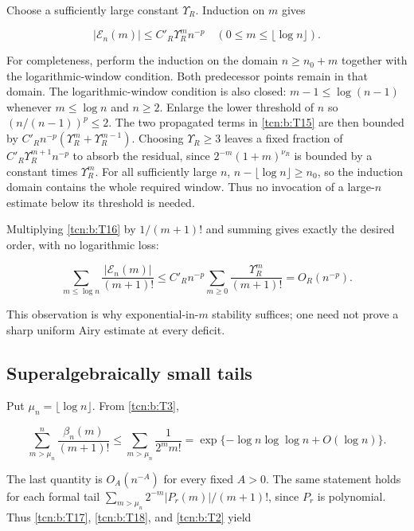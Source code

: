 \documentclass[11pt,letterpaper]{article}
\theoremstyle{remark}
\begin{document}
Choose a sufficiently large constant \(\Upsilon_R\). Induction on \(m\) gives

\[
 |\mathcal E_n(m)|\le C'_R\Upsilon_R^m n^{-p}
       \quad(0\le m\le\lfloor\log n\rfloor).                 \tag{T16}\label{tcn:b:T16}
\]

For completeness, perform the induction on the domain \(n\ge n_0+m\)
together with the logarithmic-window condition. Both predecessor points
remain in that domain. The logarithmic-window condition is also closed:
\(m-1\le\log(n-1)\) whenever \(m\le\log n\) and \(n\ge2\). Enlarge the
lower threshold of \(n\) so \((n/(n-1))^p\le2\). The two propagated
terms in \eqref{tcn:b:T15} are then bounded by \(C'_Rn^{-p}(\Upsilon_R^m+\Upsilon_R^{m-1})\).
Choosing \(\Upsilon_R\ge3\) leaves a fixed fraction of \(C'_R\Upsilon_R^{m+1}n^{-p}\)
to absorb the residual, since \(2^{-m}(1+m)^{\nu_R}\) is bounded by a
constant times \(\Upsilon_R^m\). For all sufficiently large \(n\),
\(n-\lfloor\log n\rfloor\ge n_0\), so the induction domain contains the
whole required window. Thus no invocation of a large-\(n\) estimate
below its threshold is needed.

Multiplying \eqref{tcn:b:T16} by \(1/(m+1)!\) and summing gives exactly the desired
order, with no logarithmic loss:

\[
 \sum_{m\le\log n}\frac{|\mathcal E_n(m)|}{(m+1)!}
 \le C'_Rn^{-p}\sum_{m\ge0}\frac{\Upsilon_R^m}{(m+1)!}
 =O_R(n^{-p}).                                                \tag{T17}\label{tcn:b:T17}
\]

This observation is why exponential-in-\(m\) stability suffices; one
need not prove a sharp uniform Airy estimate at every deficit.

\subsection{Superalgebraically small
tails}\label{tcn:b:superalgebraically-small-tails}

Put \(\mu_n=\lfloor\log n\rfloor\). From \eqref{tcn:b:T3},

\[
 \sum_{m>\mu_n}^n\frac{\beta_n(m)}{(m+1)!}
 \le\sum_{m>\mu_n}\frac1{2^m m!}
 =\exp\{-\log n\log\log n+O(\log n)\}.                     \tag{T18}\label{tcn:b:T18}
\]

The last quantity is \(O_A(n^{-A})\) for every fixed \(A>0\). The same
statement holds for each formal tail
\(\sum_{m>\mu_n}2^{-m}|P_r(m)|/(m+1)!\), since \(P_r\) is polynomial. Thus
\eqref{tcn:b:T17}, \eqref{tcn:b:T18}, and \eqref{tcn:b:T2} yield
\end{document}
